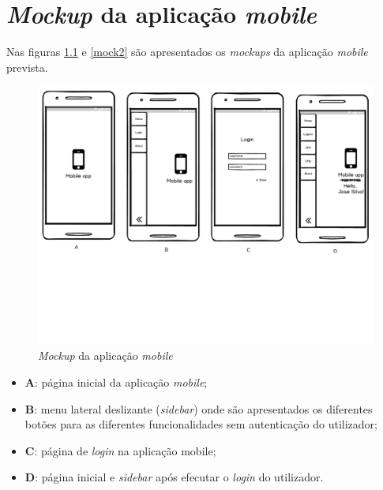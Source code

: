 \newpage
\chapter{\textit{Mockup} da aplicação \textit{mobile}}
\label{Mockup}

Nas figuras \ref{mock1} e \ref{mock2} são apresentados os \textit{mockups} da aplicação \textit{mobile} prevista. 


\begin{figure}[h]
	\centering
	\includegraphics[width=\linewidth]{esquemas/mockup/1.pdf}
	\caption{\textit{Mockup} da aplicação \textit{mobile}}
	\label{mock1}
\end{figure}

\begin{itemize}
	\item \textbf{A}: página inicial da aplicação \textit{mobile}; 
	\item \textbf{B}: menu lateral deslizante (\textit{sidebar}) onde são apresentados os diferentes botões para as diferentes funcionalidades sem autenticação do utilizador; 
	
	\item \textbf{C}: página de \textit{login} na aplicação mobile; 
	\item \textbf{D}: página inicial e \textit{sidebar} após efecutar o \textit{login} do utilizador. 
\end{itemize}


\newpage


